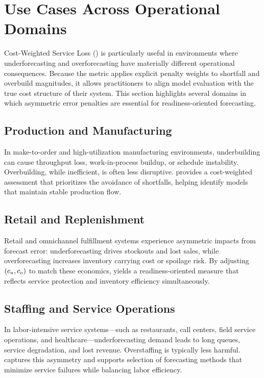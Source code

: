 \section{Use Cases Across Operational Domains}

Cost-Weighted Service Loss (\CWSL) is particularly useful in environments where
underforecasting and overforecasting have materially different operational
consequences. Because the metric applies explicit penalty weights to shortfall
and overbuild magnitudes, it allows practitioners to align model evaluation with
the true cost structure of their system. This section highlights several domains
in which asymmetric error penalties are essential for readiness-oriented
forecasting.

\subsection{Production and Manufacturing}

In make-to-order and high-utilization manufacturing environments, underbuilding
can cause throughput loss, work-in-process buildup, or schedule instability.
Overbuilding, while inefficient, is often less disruptive. \CWSL{} provides a
cost-weighted assessment that prioritizes the avoidance of shortfalls, helping
identify models that maintain stable production flow.

\subsection{Retail and Replenishment}

Retail and omnichannel fulfillment systems experience asymmetric impacts from
forecast error: underforecasting drives stockouts and lost sales, while
overforecasting increases inventory carrying cost or spoilage risk. By adjusting
\((c_u, c_o)\) to match these economics, \CWSL{} yields a readiness-oriented
measure that reflects service protection and inventory efficiency simultaneously.

\subsection{Staffing and Service Operations}

In labor-intensive service systems—such as restaurants, call centers, field
service operations, and healthcare—underforecasting demand leads to long queues,
service degradation, and lost revenue. Overstaffing is typically less harmful.
\CWSL{} captures this asymmetry and supports selection of forecasting methods
that minimize service failures while balancing labor efficiency.

